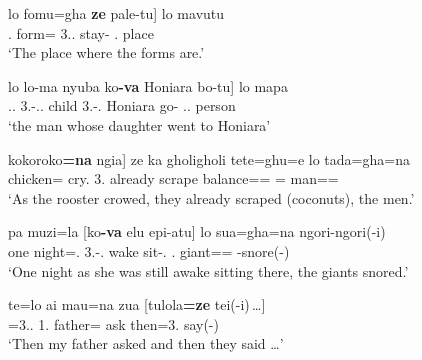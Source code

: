 \begin{exe}\ex\label{SavRel}
\begin{xlist}
\ex\gll  {\rm[}lo fomu=gha \textbf{ze} pale-tu{\rm]} lo mavutu\\ 
         \hspaceThis{[}\deter{}.\pl{} form=\pl{} 3.\pl{}.\gen{} stay-\relativ{} \deter{}.\sg{} place \\
\glt`The place where the forms are.'%

\ex\gll  {\rm[}lo lo-ma nyuba ko\textbf{-va} Honiara bo-tu{\rm]} lo mapa\\
         \hspaceThis{[}\deter{}.\sg{}.\mas{} 3\sg{}.\mas{}-\gen{}.\sg{}.\fem{} child 3\sg{}.\fem{}-\gen{}.\mas{} Honiara go-\relativ{} \deter{}.\sg{}.\mas{} person\\
\glt `the man whose daughter went to Honiara'%
\end{xlist}
\end{exe}%
%
\begin{exe}\ex\label{SavAdv}
\begin{xlist}
\ex\gll  {\rm[}kokoroko\textbf{=na} ngia{\rm]} ze ka gholigholi tete=ghu=e lo tada=gha=na\\
         \hspaceThis{[}chicken=\nom{} cry.\simult{} 3\pl{}.\gen{} already scrape balance=\nmlz{}=\emphat{} \deter{}=\pl{} man=\pl{}=\nom{}\\
\glt `As the rooster crowed, they already scraped (coconuts), the men.' %

\ex\gll pa  muzi=la              {\rm[}ko\textbf{-va} elu epi-atu{\rm]} lo sua=gha=na ngori-ngori(-i)\\
        one night=\loc{}.\mas{}  \hspaceThis{[}3\sg{}.\fem{}-\gen{}.\mas{} wake sit-\bg{}.\ipfv{} \deter{}.\pl{} giant=\pl{}=\nom{} \rdp{}-snore(-\fin{})\\
\glt`One night as she was still awake sitting there, the giants snored.' %

\ex\gll te=lo                        ai            mau=na        zua    {\rm[}tulola\textbf{=ze} tei(-i)\,\dots{\rm]}\\
        \conj{}=3\sg{}.\mas{}.\nom{} 1\sg{}.\gen{} father=\nom{} ask \hspaceThis{[}then=3\pl{}.\nom{} say(-\fin{})\\
\glt`Then my father asked and then they said \dots' %
\end{xlist}
\end{exe}


